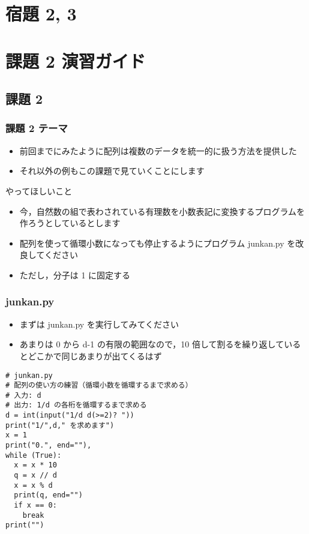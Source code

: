 %
%
\section{宿題 2, 3}
%
%
\section{課題 2 演習ガイド}
\subsection{課題 2}
\begin{frame}[label=quiz2]
\frametitle{課題 2 テーマ}
  \begin{itemize}
\item 前回までにみたように配列は複数のデータを統一的に扱う方法を提供した
\item それ以外の例もこの課題で見ていくことにします
  \end{itemize}
  \begin{block}{やってほしいこと}
    \begin{itemize}
\item 今，自然数の組で表わされている有理数を小数表記に変換するプログラムを作ろうとしているとします
\item 配列を使って循環小数になっても停止するようにプログラム junkan.py を改良してください
\item ただし，分子は 1 に固定する
    \end{itemize}
  \end{block}
\end{frame}
\begin{frame}
\frametitle{junkan.py}
  \begin{itemize}
\item まずは junkan.py を実行してみてください
\item あまりは 0 から d-1 の有限の範囲なので，10 倍して割るを繰り返しているとどこかで同じあまりが出てくるはず
  \end{itemize}
  \begin{lstlisting}[caption={junkan.py},label=lst:rational]
# junkan.py
# 配列の使い方の練習（循環小数を循環するまで求める）
# 入力: d
# 出力: 1/d の各桁を循環するまで求める
d = int(input("1/d d(>=2)? "))
print("1/",d," を求めます")
x = 1
print("0.", end=""),
while (True):
  x = x * 10
  q = x // d
  x = x % d
  print(q, end="")
  if x == 0:
    break
print("")
  \end{lstlisting}
\end{frame}
